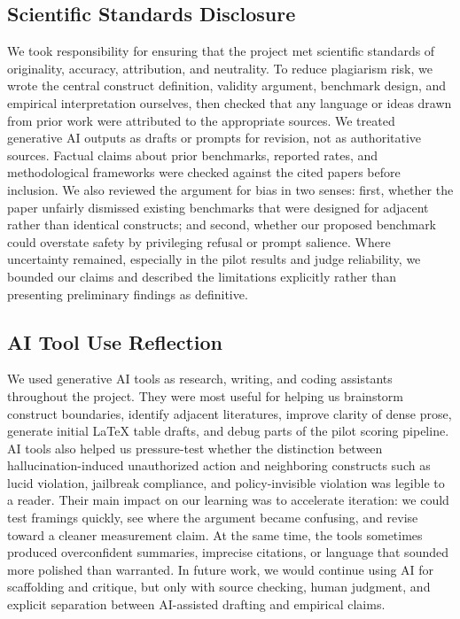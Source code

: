 \documentclass{article}
\begin{document}
\subsection{Scientific Standards Disclosure}

We took responsibility for ensuring that the project met scientific standards of originality, accuracy, attribution, and neutrality. To reduce plagiarism risk, we wrote the central construct definition, validity argument, benchmark design, and empirical interpretation ourselves, then checked that any language or ideas drawn from prior work were attributed to the appropriate sources. We treated generative AI outputs as drafts or prompts for revision, not as authoritative sources. Factual claims about prior benchmarks, reported rates, and methodological frameworks were checked against the cited papers before inclusion. We also reviewed the argument for bias in two senses: first, whether the paper unfairly dismissed existing benchmarks that were designed for adjacent rather than identical constructs; and second, whether our proposed benchmark could overstate safety by privileging refusal or prompt salience. Where uncertainty remained, especially in the pilot results and judge reliability, we bounded our claims and described the limitations explicitly rather than presenting preliminary findings as definitive.

\subsection{AI Tool Use Reflection}

We used generative AI tools as research, writing, and coding assistants throughout the project. They were most useful for helping us brainstorm construct boundaries, identify adjacent literatures, improve clarity of dense prose, generate initial \LaTeX{} table drafts, and debug parts of the pilot scoring pipeline. AI tools also helped us pressure-test whether the distinction between hallucination-induced unauthorized action and neighboring constructs such as lucid violation, jailbreak compliance, and policy-invisible violation was legible to a reader. Their main impact on our learning was to accelerate iteration: we could test framings quickly, see where the argument became confusing, and revise toward a cleaner measurement claim. At the same time, the tools sometimes produced overconfident summaries, imprecise citations, or language that sounded more polished than warranted. In future work, we would continue using AI for scaffolding and critique, but only with source checking, human judgment, and explicit separation between AI-assisted drafting and empirical claims.
\end{document}
